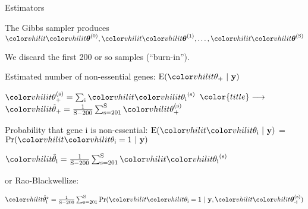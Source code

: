 \documentclass[aspectratio=169,12pt,t]{beamer}
\newcommand{\one}{\text{1}}
\newcommand{\boldy}{\text{\textbf{y}}}
\newcommand{\thetai}{{\vhilit \theta_\text{i}}}
\newcommand{\sumi}{\sum_\text{i}}
\newcommand{\boldtheta}{{\vhilit \boldsymbol{\theta}}}
\begin{document}
\begin{frame}{Estimators}


The Gibbs sampler produces ${\vhilit
\boldtheta^\text{(0)}},  {\vhilit
\boldtheta^\text{(1)}}, \dots, {\vhilit
\boldtheta^\text{(S)}}$

\smallskip

We discard the first 200 or so samples (``burn-in'').

\bigskip
\bigskip

{\color{title} Estimated number of non-essential genes}:
$\text{E}({\vhilit \theta_+}  \ | \ \boldy)$

\smallskip

\hspace{30mm} ${\vhilit \theta_+^\text{(s)}} = \sumi
{\vhilit \thetai^\text{(s)}}$ \hspace{15mm}
${\color{title} \longrightarrow}$ \hspace{15mm}
${\vhilit \hat{\theta}_+} = \textstyle{\frac{\one}{\text{S} -
\text{200}} \sum_{\text{s}=\text{201}}^\text{S} {\vhilit \theta_+^\text{(s)}}}$

\bigskip
\bigskip

{\color{title} Probability that gene i is non-essential}:
$\text{E}({\vhilit \thetai} \ | \ \boldy)$ =
$\text{Pr}({\vhilit \thetai} = \one \ | \ \boldy)$

\smallskip

\hspace{30mm} ${\vhilit \hat{\theta}_\text{i}} =
\textstyle{\frac{\one}{\text{S} - \text{200}} \sum_{\text{s} =
\text{201}}^\text{S} {\vhilit \thetai^\text{(s)}}}$


\bigskip
\bigskip

\hspace{10mm} {\color{title} or Rao-Blackwellize:}

\smallskip

\hspace{30mm} ${\vhilit \hat{\theta}_\text{i}^\star} =
\textstyle{\frac{\one}{\text{S} - \text{200}} \sum_{\text{s} =
\text{201}}^\text{S} \text{Pr}({\vhilit \thetai} =
\one \ | \ \boldy, {\vhilit \boldtheta_\text{-i}^\text{(s)}})}$



\note{
}
\end{frame}
\end{document}
